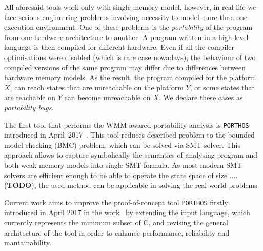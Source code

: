 All aforesaid tools work only with single memory model, however, in real life we face serious engineering problems involving necessity to model more than one execution environment. One of these problems is the \textit{portability} of the program from one hardware architecture to another. A program written in a high-level language is then compiled for different hardware. Even if all the compiler optimisations were disabled (which is rare case nowadays), the behaviour of two compiled versions of the same program may differ due to differences between hardware memory models. As the result, the program compiled for the platform $X$, can reach states that are unreachable on the platform $Y$, or some states that are reachable on $Y$ can become unreachable on $X$. We declare these cases as \textit{portability bugs}.

The first tool that performs the WMM-awared portability analysis is \texttt{PORTHOS} introduced in April~2017~\cite{Porthos17}. This tool reduces described problem to the bounded model checking (BMC) problem, which can be solved via SMT-solver. This approach allows to capture symbolically the semantics of analysing program and both weak memory models into single SMT-formula. As most modern SMT-solvers are efficient enough to be able to operate the state space of size .... (\textbf{TODO}), the used method can be applicable in solving the real-world problems.



Current work aims to improve the proof-of-concept tool \texttt{PORTHOS} firstly introduced in April 2017 in the work~\cite{Porthos17} by extending the input language, which currently represents the minimum subset of C, and revising the general architecture of the tool in order to enhance performance, reliability and mantainability.

